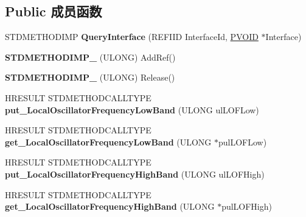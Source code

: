 \subsection*{Public 成员函数}
\begin{DoxyCompactItemize}
\item 
\mbox{\label{class_c_b_d_a_l_n_b_info_a49eab6516052bf73a0ea511d7b3c4088}} 
S\+T\+D\+M\+E\+T\+H\+O\+D\+I\+MP {\bfseries Query\+Interface} (R\+E\+F\+I\+ID Interface\+Id, \hyperlink{interfacevoid}{P\+V\+O\+ID} $\ast$Interface)
\item 
\mbox{\label{class_c_b_d_a_l_n_b_info_a02d8f353cddd803ebe329232871dcbbf}} 
{\bfseries S\+T\+D\+M\+E\+T\+H\+O\+D\+I\+M\+P\+\_\+} (U\+L\+O\+NG) Add\+Ref()
\item 
\mbox{\label{class_c_b_d_a_l_n_b_info_a108b9ad03c3c5e8d2d00fb06f478539c}} 
{\bfseries S\+T\+D\+M\+E\+T\+H\+O\+D\+I\+M\+P\+\_\+} (U\+L\+O\+NG) Release()
\item 
\mbox{\label{class_c_b_d_a_l_n_b_info_aad22c2fd9581488f4ea94d5e8c9452f2}} 
H\+R\+E\+S\+U\+LT S\+T\+D\+M\+E\+T\+H\+O\+D\+C\+A\+L\+L\+T\+Y\+PE {\bfseries put\+\_\+\+Local\+Oscillator\+Frequency\+Low\+Band} (U\+L\+O\+NG ul\+L\+O\+F\+Low)
\item 
\mbox{\label{class_c_b_d_a_l_n_b_info_aa058198903224c104121847a872a5ac7}} 
H\+R\+E\+S\+U\+LT S\+T\+D\+M\+E\+T\+H\+O\+D\+C\+A\+L\+L\+T\+Y\+PE {\bfseries get\+\_\+\+Local\+Oscillator\+Frequency\+Low\+Band} (U\+L\+O\+NG $\ast$pul\+L\+O\+F\+Low)
\item 
\mbox{\label{class_c_b_d_a_l_n_b_info_a44115efee495f6992a91854b788ec937}} 
H\+R\+E\+S\+U\+LT S\+T\+D\+M\+E\+T\+H\+O\+D\+C\+A\+L\+L\+T\+Y\+PE {\bfseries put\+\_\+\+Local\+Oscillator\+Frequency\+High\+Band} (U\+L\+O\+NG ul\+L\+O\+F\+High)
\item 
\mbox{\label{class_c_b_d_a_l_n_b_info_aa2750644fbea6dbee639dab141d47f1f}} 
H\+R\+E\+S\+U\+LT S\+T\+D\+M\+E\+T\+H\+O\+D\+C\+A\+L\+L\+T\+Y\+PE {\bfseries get\+\_\+\+Local\+Oscillator\+Frequency\+High\+Band} (U\+L\+O\+NG $\ast$pul\+L\+O\+F\+High)
\item 

\end{DoxyCompactItemize}
